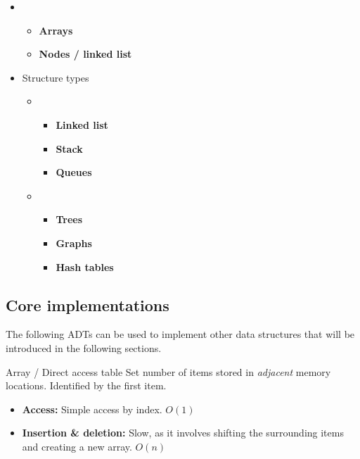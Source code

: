 \begin{itemize}
    \item {}
          \begin{itemize}
              \item \textbf{Arrays}
              \item \textbf{Nodes / linked list}
          \end{itemize}
    \item Structure types
          \begin{itemize}
              \item {}
                    \begin{itemize}
                        \item \textbf{Linked list}
                        \item \textbf{Stack}
                        \item \textbf{Queues}
                    \end{itemize}
              \item {}
                    \begin{itemize}
                        \item \textbf{Trees}
                        \item \textbf{Graphs}
                        \item \textbf{Hash tables}
                    \end{itemize}
          \end{itemize}
\end{itemize}

\subsection{Core implementations}
\label{subsec:core-implementations}

The following ADTs can be used to implement other data structures that will be introduced in the following sections.

\begin{definition}
    {Array / Direct access table}
    Set number of items stored in \textit{adjacent} memory locations. Identified by the first item.
    \begin{itemize}
        \item \textbf{Access:} Simple access by index. $O(1)$
        \item \textbf{Insertion \& deletion:} Slow, as it involves shifting the surrounding items and creating a new array. $O(n)$
    \end{itemize}
\end{definition}

